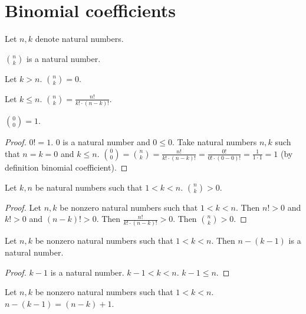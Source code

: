 \documentclass{article}
\begin{document}
\section{Binomial coefficients}

\begin{forthel}

Let $n, k$ denote natural numbers.
\begin{signature}
$\binom{n}{k}$ is a natural number.
\end{signature}


\begin{axiom}
Let $k > n$. $\binom{n}{k} = 0$.
\end{axiom}
    
\begin{axiom}
Let $k \leq n$. $\binom{n}{k} = \frac{n!}{k! \cdot (n-k)!}$.
\end{axiom}

\begin{lemma}
$\binom{0}{0} = 1$.
\end{lemma}
\begin{proof}
$0! = 1$.
$0$ is a natural number and $0 \leq 0$.
Take natural numbers $n,k$ such that $n=k=0$ and $k\leq n$.
$\binom{0}{0} = \binom{n}{k} = \frac{n!}{k! \cdot (n-k)!} = 
\frac{0!}{0! \cdot (0-0)!} = \frac{1}{1 \cdot 1} = 1$
(by definition binomial coefficient).
\end{proof}


\begin{theorem}
Let $k,n$ be natural numbers such that $1 < k < n$.
$\binom{n}{k} > 0$. 
\end{theorem}
\begin{proof}
Let $n,k$ be nonzero natural numbers such that $1 < k < n$.
Then $n! > 0$ and $k! > 0$ and $(n-k)! > 0$. 
Then $\frac{n!}{k! \cdot (n-k)!} > 0$. 
Then $\binom{n}{k} > 0$. 
\end{proof}

\begin{lemma}
Let $n,k$ be nonzero natural numbers such that $1 < k < n$.
Then $n-(k-1)$ is a natural number.
\end{lemma}
\begin{proof}
$k-1$ is a natural number. $k-1 < k < n$. $k-1 \leq n$.
\end{proof}
  
\begin{lemma}
Let $n,k$ be nonzero natural numbers such that $1 < k < n$.
$n-(k-1) = (n-k)+1$.
\end{lemma}
  

\end{forthel}
\end{document}
